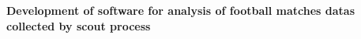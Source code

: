 \begin{center}
\textbf{Development of software for analysis of football matches datas collected by scout process\\}
\end{center}